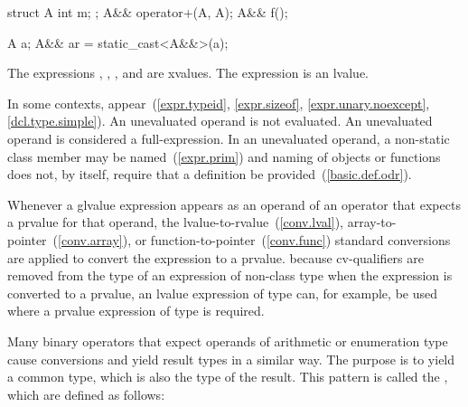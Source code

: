 \enterexample
\begin{codeblock}
struct A {
  int m;
};
A&& operator+(A, A);
A&& f();

A a;
A&& ar = static_cast<A&&>(a);
\end{codeblock}

The expressions , , , and 
are xvalues. The expression  is an lvalue.
\exitexample

\pnum
In some contexts, 
appear~(\ref{expr.typeid}, \ref{expr.sizeof}, \ref{expr.unary.noexcept}, \ref{dcl.type.simple}).
An unevaluated operand is not evaluated. An unevaluated operand is
considered a full-expression.
\enternote
In an unevaluated operand, a non-static class member may be
named~(\ref{expr.prim}) and naming of objects or functions does not, by
itself, require that a definition be provided~(\ref{basic.def.odr}).
\exitnote

\pnum
Whenever a glvalue expression appears as an operand of an operator that
expects a prvalue for that operand, the
lvalue-to-rvalue~(\ref{conv.lval}), array-to-pointer~(\ref{conv.array}),
or function-to-pointer~(\ref{conv.func}) standard conversions are
applied to convert the expression to a prvalue.
\enternote 
because cv-qualifiers are removed from the type of an expression of
non-class type when the expression is converted to a prvalue, an lvalue
expression of type  can, for example, be used where
a prvalue expression of type  is required.
\exitnote 

\pnum
{}%
Many binary operators that expect operands of arithmetic or enumeration
type cause conversions and yield result types in a similar way. The
purpose is to yield a common type, which is also the type of the result.
This pattern is called the ,
which are defined as follows:

